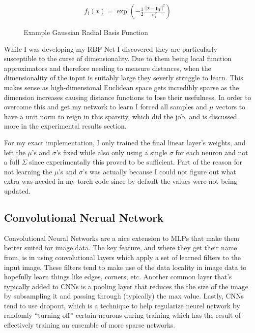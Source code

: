 \documentclass[12pt, twoside]{report}
\begin{document}
\begin{figure}[H]
    \centering
    \begin{align}
        f_i(x) = \exp\left(-\frac{1}{2}\frac{||\mathbf{x}-\mathbf{\mu_i}||^2}{\sigma_i^2}\right)
    \end{align}
    \caption*{Example Gaussian Radial Basis Function}
\end{figure}

While I was developing my RBF Net I discovered they are particularly susceptible to the curse of dimensionality.
Due to them being local function approximators and therefore needing to measure distances, when the 
dimensionality of the input is suitably large they severly struggle to learn.
This makes sense as high-dimensional Euclidean space gets incredibly sparse as the dimension increases causing
distance functions to lose their usefulness. In order to overcome this and get my network to learn
I forced all samples and $\mu$ vectors to have a unit norm to reign in this sparsity, which did the job, and
is discussed more in the experimental results section.

For my exact implementation, I only trained the final linear layer's weights, and left the $\mu$'s and
$\sigma$'s fixed while also only using a single $\sigma$ for each neuron and not a full $\Sigma$ since
experimentally this proved to be sufficient. Part of the reason for not learning the $\mu$'s and $\sigma$'s
was actually because I could not figure out what extra was needed in my torch code since by default the values
were not being updated.

\subsection{Convolutional Nerual Network}

Convolutional Neural Networks are a nice extension to MLPs that make them better suited for
image data. The key feature, and where they get their name from, is in using convolutional layers which
apply a set of learned filters to the input image. These filters tend to make use of the data locality in image
data to hopefully learn things like edges, corners, etc.
Another common layer that's typically added to CNNs is a pooling layer that reduces the the size of the image
by subsampling it and passing through (typically) the max value.
Lastly, CNNs tend to use dropout, which is a technique to help regularize neurel network by randomly
``turning off'' certain neurons during training which has the result of effectively training an ensemble of
more sparse networks.
\end{document}
